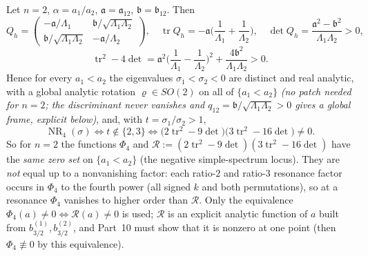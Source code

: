 \begin{corollary}[$n=2$: explicit]\label{bpP:p9:n2}
Let $n=2$, $\alpha=a_1/a_2$, $\mathfrak a=\mathfrak a_{12}$, $\mathfrak b=\mathfrak b_{12}$. Then
\[Q_h=\begin{pmatrix}-\mathfrak a/\Lambda_1&\mathfrak b/\sqrt{\Lambda_1\Lambda_2}\\ \mathfrak b/\sqrt{\Lambda_1\Lambda_2}&-\mathfrak a/\Lambda_2\end{pmatrix},\quad\operatorname{tr}Q_h=-\mathfrak a\Big(\frac1{\Lambda_1}+\frac1{\Lambda_2}\Big),\quad\det Q_h=\frac{\mathfrak a^2-\mathfrak b^2}{\Lambda_1\Lambda_2}>0,\]
\[\operatorname{tr}^2-4\det=\mathfrak a^2\Big(\frac1{\Lambda_1}-\frac1{\Lambda_2}\Big)^2+\frac{4\mathfrak b^2}{\Lambda_1\Lambda_2}>0 .\]
Hence for every $a_1<a_2$ the eigenvalues $\sigma_1<\sigma_2<0$ are distinct and real analytic, with a global analytic rotation $\varrho\in SO(2)$ on all of $\{a_1<a_2\}$ \emph{(no patch needed for $n=2$; the discriminant never vanishes and $q_{12}=\mathfrak b/\sqrt{\Lambda_1\Lambda_2}>0$ gives a global frame, explicit below)}, and, with $t=\sigma_1/\sigma_2>1$,
\[\operatorname{NR}_4(\sigma)\iff t\notin\{2,3\}\iff\big(2\operatorname{tr}^2-9\det\big)\big(3\operatorname{tr}^2-16\det\big)\ne0 .\]
So for $n=2$ the functions $\Phi_4$ and $\mathcal R:=(2\operatorname{tr}^2-9\det)(3\operatorname{tr}^2-16\det)$ have the \emph{same zero set} on $\{a_1<a_2\}$ (the negative simple-spectrum locus). They are \emph{not} equal up to a nonvanishing factor: each ratio-$2$ and ratio-$3$ resonance factor occurs in $\Phi_4$ to the fourth power (all signed $k$ and both permutations), so at a resonance $\Phi_4$ vanishes to higher order than $\mathcal R$. Only the equivalence $\Phi_4(a)\ne0\iff\mathcal R(a)\ne0$ is used; $\mathcal R$ is an explicit analytic function of $a$ built from $b_{3/2}^{(1)},b_{3/2}^{(2)}$, and Part~10 must show that it is nonzero at one point (then $\Phi_4\not\equiv0$ by this equivalence).
\end{corollary}
